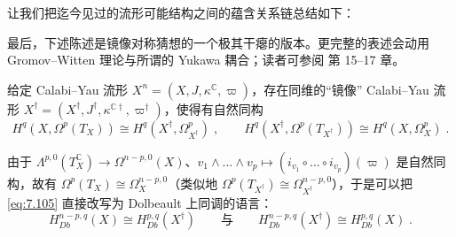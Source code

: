 让我们把迄今见过的流形可能结构之间的蕴含关系链总结如下：

\begin{center}
\begin{minipage}{0.92\linewidth}\centering
{}
\end{minipage}
\end{center}

最后，下述陈述是镜像对称猜想的一个极其干瘪的版本。更完整的表述会动用 Gromov–Witten 理论与所谓的 Yukawa 耦合；读者可参阅 \cite{GHJ03} 第 15–17 章。

\begin{Con}[镜像对称猜想]\label{con:7.8}
给定 Calabi–Yau 流形 $X^n=(X,J,\kappa^{\mathbb C},\varpi)$，存在同维的“镜像” Calabi–Yau 流形 $X^\dagger=(X^\dagger,J^\dagger,\kappa^{\mathbb C\dagger},\varpi^\dagger)$，使得有自然同构
\begin{equation}\label{eq:7.105}
H^q(X,\Omega^p(T_X))\cong H^q(X^\dagger,\Omega^p_{X^\dagger})\;,\qquad
H^q(X^\dagger,\Omega^p(T_{X^\dagger}))\cong H^q(X,\Omega^p_X)\;.
\end{equation}
\end{Con}

由于 $\Lambda^{p,0}(T_X^{\mathbb C})\to\Omega^{n-p,0}(X)$、$v_1\wedge\dots\wedge v_p\mapsto(i_{v_1}\circ\dots\circ i_{v_p})(\varpi)$ 是自然同构，故有 $\Omega^p(T_X)\cong\Omega^{n-p,0}_X$（类似地 $\Omega^p(T_{X^\dagger})\cong\Omega^{n-p,0}_{X^\dagger}$），于是可以把 \eqref{eq:7.105} 直接改写为 Dolbeault 上同调的语言：
\begin{equation}\label{eq:7.106}
H^{n-p,q}_{Db}(X)\cong H^{p,q}_{Db}(X^\dagger)\qquad\text{与}\qquad H^{n-p,q}_{Db}(X^\dagger)\cong H^{p,q}_{Db}(X)\;.
\end{equation}


